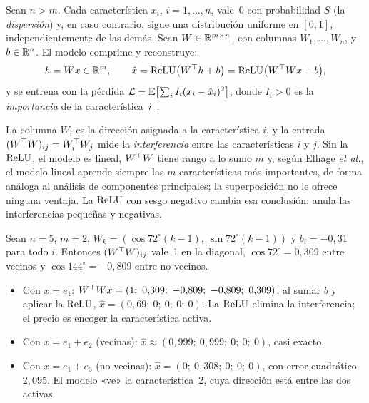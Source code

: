 \begin{definicion}\label{def:juguete}
Sean $n>m$. Cada característica $x_i$, $i=1,\dots,n$, vale~0 con probabilidad $S$ (la \emph{dispersión}) y, en caso contrario, sigue una distribución uniforme en $[0,1]$, independientemente de las demás. Sean $W\in\mathbb{R}^{m\times n}$, con columnas $W_1,\dots,W_n$, y $b\in\mathbb{R}^{n}$. El modelo comprime y reconstruye:
\[
h=Wx\in\mathbb{R}^{m},\qquad \hat x=\operatorname{ReLU}\bigl(W^{\top} h+b\bigr)=\operatorname{ReLU}\bigl(W^{\top} Wx+b\bigr),
\]
y se entrena con la pérdida $\mathcal{L}=\mathbb{E}\bigl[\sum_iI_i(x_i-\hat x_i)^{2}\bigr]$, donde $I_i>0$ es la \emph{importancia} de la característica~$i$~\cite[«Experiment Setup»]{elhage22}.
\end{definicion}

La columna $W_i$ es la dirección asignada a la característica $i$, y la entrada $(W^{\top} W)_{ij}=W_i^{\top} W_j$ mide la \emph{interferencia} entre las características $i$ y $j$. Sin la $\operatorname{ReLU}$, el modelo es lineal, $W^{\top} W$ tiene rango a lo sumo $m$ y, según Elhage \emph{et al.}, el modelo lineal aprende siempre las $m$ características más importantes, de forma análoga al análisis de componentes principales; la superposición no le ofrece ninguna ventaja. La $\operatorname{ReLU}$ con sesgo negativo cambia esa conclusión: anula las interferencias pequeñas y negativas.

\begin{ejemplo}[El pentágono]\label{ej:pentagono}
Sean $n=5$, $m=2$, $W_k=(\cos 72^\circ(k-1),\ \sin 72^\circ(k-1))$ y $b_i=-0{,}31$ para todo $i$. Entonces $(W^{\top} W)_{ij}$ vale~1 en la diagonal, $\cos 72^\circ=0{,}309$ entre vecinos y $\cos 144^\circ=-0{,}809$ entre no vecinos.
\begin{itemize}[leftmargin=1.4em]
  \item Con $x=e_1$: $W\T Wx=(1;\allowbreak\ 0{,}309;\allowbreak\ -0{,}809;\allowbreak\ -0{,}809;\allowbreak\ 0{,}309)$; al sumar $b$ y aplicar la $\operatorname{ReLU}$, $\hat x=(0{,}69;\allowbreak\ 0;\allowbreak\ 0;\allowbreak\ 0;\allowbreak\ 0)$. La $\operatorname{ReLU}$ elimina la interferencia; el precio es encoger la característica activa.
  \item Con $x=e_1+e_2$ (vecinas): $\hat x\approx(0{,}999;\allowbreak\ 0{,}999;\allowbreak\ 0;\allowbreak\ 0;\allowbreak\ 0)$, casi exacto.
  \item Con $x=e_1+e_3$ (no vecinas): $\hat x=(0;\allowbreak\ 0{,}308;\allowbreak\ 0;\allowbreak\ 0;\allowbreak\ 0)$, con error cuadrático $2{,}095$. El modelo «ve» la característica~2, cuya dirección está entre las dos activas.
\end{itemize}
\end{ejemplo}

